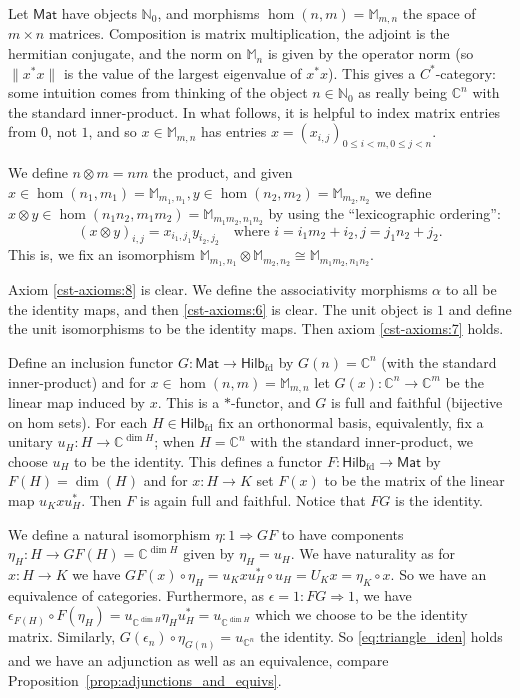 \documentclass[a4paper,11pt]{article}
\theoremstyle{plain}
\theoremstyle{remark}
\newenvironment{example}
  {\pushQED{\qed}\renewcommand{\qedsymbol}{$\triangle$}\examplex}
  {\popQED\endexamplex}
\newcommand{\catHilbFD}{\textsf{Hilb}_{\text{fd}}}
\newcommand{\catMat}{\textsf{Mat}}
\begin{document}
\begin{example}\label{eq:hilb_skel_tensor}
Let $\catMat$ have objects $\mathbb N_0$, and morphisms $\hom(n, m) = \mathbb M_{m,n}$ the space of $m\times n$ matrices.  Composition is matrix multiplication, the adjoint is the hermitian conjugate, and the norm on $\mathbb M_n$ is given by the operator norm (so $\|x^*x\|$ is the value of the largest eigenvalue of $x^*x$).  This gives a $C^*$-category: some intuition comes from thinking of the object $n\in\mathbb N_0$ as really being $\mathbb C^n$ with the standard inner-product.  In what follows, it is helpful to index matrix entries from $0$, not $1$, and so $x\in \mathbb M_{m,n}$ has entries $x = (x_{i,j})_{0\leq i<m, 0\leq j<n}$.

We define $n\otimes m = nm$ the product, and given $x\in\hom(n_1, m_1) = \mathbb M_{m_1, n_1}, y\in\hom(n_2,m_2) = \mathbb M_{m_2, n_2}$ we define $x\otimes y \in \hom(n_1n_2, m_1m_2) = \mathbb M_{m_1m_2, n_1n_2}$ by using the ``lexicographic ordering'':
\[ (x\otimes y)_{i,j} = x_{i_1, j_1} y_{i_2,j_2} \quad\text{where } i = i_1m_2 + i_2, j=j_1n_2 + j_2. \]
This is, we fix an isomorphism $\mathbb M_{m_1, n_1} \otimes \mathbb M_{m_2, n_2} \cong \mathbb M_{m_1m_2, n_1n_2}$.

Axiom \ref{cst-axioms:8} is clear.  We define the associativity morphisms $\alpha$ to all be the identity maps, and then \ref{cst-axioms:6} is clear.  The unit object is $1$ and define the unit isomorphisms to be the identity maps.  Then axiom \ref{cst-axioms:7} holds.

Define an inclusion functor $G \colon \catMat \to \catHilbFD$ by $G(n) = \mathbb C^n$ (with the standard inner-product) and for $x\in\hom(n,m) = \mathbb M_{m,n}$ let $G(x) \colon \mathbb C^n \to \mathbb C^m$ be the linear map induced by $x$.  This is a $*$-functor, and $G$ is full and faithful (bijective on hom sets).  For each $H\in\catHilbFD$ fix an orthonormal basis, equivalently, fix a unitary $u_H \colon H \to \mathbb C^{\dim H}$; when $H=\mathbb C^n$ with the standard inner-product, we choose $u_H$ to be the identity.  This defines a functor $F \colon \catHilbFD \to \catMat$ by $F(H) = \dim(H)$ and for $x\colon H\to K$ set $F(x)$ to be the matrix of the linear map $u_K x u_H^*$.  Then $F$ is again full and faithful.  Notice that $FG$ is the identity.

We define a natural isomorphism $\eta \colon 1 \Rightarrow GF$ to have components $\eta_H \colon H \to GF(H) = \mathbb C^{\dim H}$ given by $\eta_H = u_H$.  We have naturality as for $x\colon H\to K$ we have $GF(x) \circ \eta_H = u_K x u_H^* \circ u_H = U_K x = \eta_K \circ x$.  So we have an equivalence of categories.  Furthermore, as $\epsilon=1 \colon FG \Rightarrow 1$, we have $\epsilon_{F(H)} \circ F(\eta_H) = u_{\mathbb C^{\dim H}} \eta_H u_H^* = u_{\mathbb C^{\dim H}}$ which we choose to be the identity matrix.  Similarly, $G(\epsilon_n) \circ \eta_{G(n)} = u_{\mathbb C^n}$ the identity.  So \eqref{eq:triangle_iden} holds and we have an adjunction as well as an equivalence, compare Proposition~\ref{prop:adjunctions_and_equivs}.
\end{example}
\end{document}
